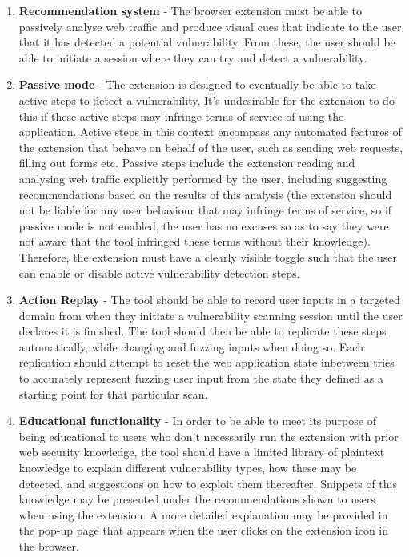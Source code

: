 \begin{enumerate}
	\item \textbf{Recommendation system} - The browser extension must be able to passively analyse web traffic and produce visual cues that indicate to the user that it has detected a potential vulnerability. From these, the user should be able to initiate a session where they can try and detect a vulnerability.
	
	\item \textbf{Passive mode} - The extension is designed to eventually be able to take active steps to detect a vulnerability. It's undesirable for the extension to do this if these active steps may infringe terms of service of using the application. Active steps in this context encompass any automated features of the extension that behave on behalf of the user, such as sending web requests, filling out forms etc. Passive steps include the extension reading and analysing web traffic explicitly performed by the user, including suggesting recommendations based on the results of this analysis (the extension should not be liable for any user behaviour that may infringe terms of service, so if passive mode is not enabled, the user has no excuses so as to say they were not aware that the tool infringed these terms without their knowledge). Therefore, the extension must have a clearly visible toggle such that the user can enable or disable active vulnerability detection steps. 
	
	\item \textbf{Action Replay} - The tool should be able to record user inputs in a targeted domain from when they initiate a vulnerability scanning session until the user declares it is finished. The tool should then be able to replicate these steps automatically, while changing and fuzzing inputs when doing so. Each replication should attempt to reset the web application state inbetween tries to accurately represent fuzzing user input from the state they defined as a starting point for that particular scan.
	
	\item \textbf{Educational functionality} - In order to be able to meet its purpose of being educational to users who don't necessarily run the extension with prior web security knowledge, the tool should have a limited library of plaintext knowledge to explain different vulnerability types, how these may be detected, and suggestions on how to exploit them thereafter. Snippets of this knowledge may be presented under the recommendations shown to users when using the extension. A more detailed explanation may be provided in the pop-up page that appears when the user clicks on the extension icon in the browser.
\end{enumerate}




